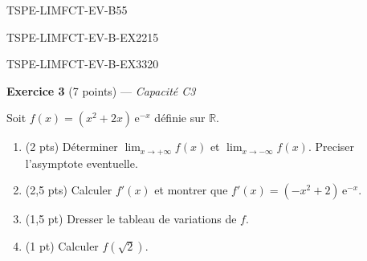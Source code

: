 \begin{evaluation}{TSPE-LIMFCT-EV-B}{55}
\begin{exercice}{TSPE-LIMFCT-EV-B-EX2}{2}{15}
\end{exercice}


\begin{exercice}{TSPE-LIMFCT-EV-B-EX3}{3}{20}

\textbf{Exercice 3} (7 points) — \textit{Capacité C3}

\medskip

Soit $f(x) = (x^2 + 2x)\,\mathrm{e}^{-x}$ définie sur $\mathbb{R}$.

\begin{enumerate}
  \item (2 pts) Déterminer $\lim_{x \to +\infty} f(x)$ et $\lim_{x \to -\infty} f(x)$. Preciser l'asymptote eventuelle.
  \item (2,5 pts) Calculer $f'(x)$ et montrer que $f'(x) = (-x^2 + 2)\,\mathrm{e}^{-x}$.
  \item (1,5 pt) Dresser le tableau de variations de $f$.
  \item (1 pt) Calculer $f(\sqrt{2})$.
\end{enumerate}

\end{exercice}

\end{evaluation}
